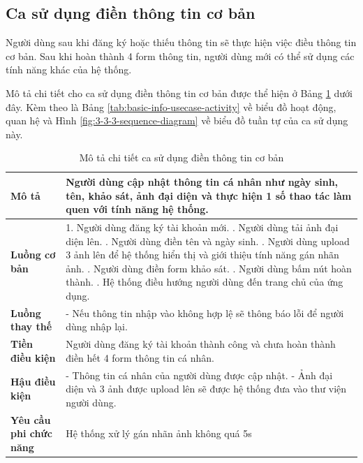 \subsection{Ca sử dụng điền thông tin cơ bản}

Người dùng sau khi đăng ký hoặc thiếu thông tin sẽ thực hiện việc điều thông tin cơ bản. Sau khi hoàn thành 4 form thông tin, người dùng mới có thể sử dụng các tính năng khác của hệ thống.

Mô tả chi tiết cho ca sử dụng điền thông tin cơ bản được thể hiện ở Bảng \ref{tab:basic-info-usecase} dưới đây. Kèm theo là Bảng \ref{tab:basic-info-usecase-activity} về biểu đồ hoạt động, quan hệ và Hình \ref{fig:3-3-3-sequence-diagram} về biểu đồ tuần tự của ca sử dụng này. 

\noindent 
\begin{table}[H]
\centering
\caption{Mô tả chi tiết ca sử dụng điền thông tin cơ bản}
\label{tab:basic-info-usecase}
\begin{tabularx}{\linewidth}{| l | X |} 
\hline 
\textbf{Mô tả} & Người dùng cập nhật thông tin cá nhân như ngày sinh, tên, khảo sát, ảnh đại diện và thực hiện 1 số thao tác làm quen với tính năng hệ thống. \\ 
\hline 
\textbf{Luồng cơ bản} & 1. Người dùng đăng ký tài khoản mới. \newline
                       2. Người dùng tải ảnh đại diện lên. \newline
                       3. Người dùng điền tên và ngày sinh. \newline
                       4. Người dùng upload 3 ảnh lên để hệ thống hiển thị và giới thiệu tính năng gán nhãn ảnh. \newline
                       5. Người dùng điền form khảo sát. \newline
                       6. Người dùng bấm nút hoàn thành. \newline
                       7. Hệ thống điều hướng người dùng đến trang chủ của ứng dụng. \\
\hline 
\textbf{Luồng thay thế} &
                       - Nếu thông tin nhập vào không hợp lệ sẽ thông báo lỗi để người dùng nhập lại. \\ 
\hline 
\textbf{Tiền điều kiện} & Người dùng đăng ký tài khoản thành công và chưa hoàn thành điền hết 4 form thông tin cá nhân. \\
\hline 
\textbf{Hậu điều kiện} & - Thông tin cá nhân của người dùng được cập nhật. \newline
                       - Ảnh đại diện và 3 ảnh được upload lên sẽ được hệ thống đưa vào thư viện người dùng. \\ 
\hline 
\textbf{Yêu cầu phi chức năng} & Hệ thống xử lý gán nhãn ảnh không quá 5s \\
\hline 
\end{tabularx}
\end{table}
\vspace{0.8cm}

